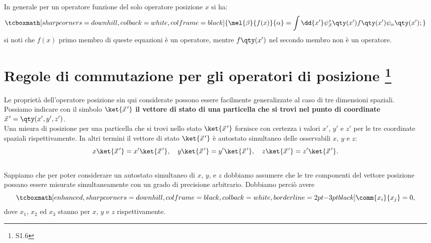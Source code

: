 In generale per un operatore funzione del solo operatore posizione $x$ si ha:
	\begin{equation}
		\tcboxmath[sharp corners=downhill, colback=white, colframe=black]{
			\mel{\beta}{f(x)}{\alpha} = \int\dd{x'}\psi_{\beta}^*\qty(x')f\qty(x')\psi_{\alpha}\qty(x') ;
			}
	\end{equation}
si noti che $f(x)$ primo membro di queste equazioni è un operatore, mentre $f\qty(x')$ nel secondo membro non è un operatore.
\section[Regole di commutazione per gli operatori di posizione]{Regole di commutazione per gli operatori di posizione \footnote{S1.6}}
Le proprietà dell'operatore posizione sin qui considerate possono essere facilmente generalizzate al caso di tre dimensioni spaziali.\\

Possiamo indicare con il simbolo $\ket{\vec{x}^{\, \prime}}$ \textbf{il vettore di stato di una particella che si trovi nel punto di coordinate ${\vec{x}}^{\, \prime}= \qty(x',y',z')$}.\\

Una misura di posizione per una particella che si trovi nello stato $\ket{\vec{x}^{\, \prime}}$ fornisce con certezza i valori $x'$, $y'$ e $z'$ per le tre coordinate spaziali rispettivamente. In altri termini il vettore di stato $\ket{\vec{x}^{\, \prime}}$ è autostato simultaneo delle osservabili $x$, $y$ e $z$:
	\begin{equation}
		x\ket{\vec{x}^{\, \prime}}=x'\ket{\vec{x}^{\, \prime}},\quad y\ket{\vec{x}^{\, \prime}}=y'\ket{\vec{x}^{\, \prime}},\quad z\ket{\vec{x}^{\, \prime}}=z'\ket{\vec{x}^{\, \prime}} .
	\end{equation}\\
	
Sappiamo che per poter considerare un autostato simultaneo di $x$, $y$, e $z$ dobbiamo assumere che le tre componenti del vettore posizione possano essere misurate simultaneamente con un grado di precisione arbitrario. Dobbiamo perciò avere
	\begin{equation}
		\tcboxmath[enhanced, sharp corners=downhill, colframe=black, colback=white, borderline={2pt}{-3pt}{black}]{
			\comm{x_i}{x_j}= 0 ,
			}
	\end{equation}
dove $x_1$, $x_2$ ed $x_3$ stanno per $x$, $y$ e $z$ rispettivamente.
